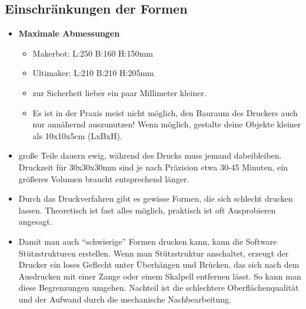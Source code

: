 \documentclass{\basedir/fablab-document}
\begin{document}
\subsection{Einschränkungen der Formen}
\begin{itemize}
\item \textbf{Maximale Abmessungen} 
\begin{itemize}
 \item Makerbot: L:250 B:160 H:150mm
 \item Ultimaker: L:210 B:210 H:205mm
 \item zur Sicherheit lieber ein paar Millimeter kleiner.
 \item Es ist in der Praxis meist nicht möglich, den Bauraum des Druckers auch nur annähernd auszunutzen! Wenn möglich, gestalte deine Objekte kleiner als 10x10x5cm (LxBxH).
\end{itemize}
\item große Teile dauern ewig, während des Drucks muss jemand dabeibleiben. Druckzeit für 30x30x30mm sind je 
nach Präzision etwa 30-45 Minuten, ein größeres Volumen braucht entsprechend länger.
\item Durch das Druckverfahren gibt es gewisse Formen, die sich schlecht drucken lassen. Theoretisch ist fast
alles möglich, praktisch ist oft Ausprobieren angesagt. 
\item Damit man auch \enquote{schwierige} Formen drucken kann, kann die Software Stützstrukturen erstellen. Wenn man Stützstruktur anschaltet,
erzeugt der Drucker ein loses Geflecht unter Überhängen und Brücken,
das sich nach dem Ausdrucken mit einer Zange oder einem Skalpell entfernen lässt. So kann
man diese Begrenzungen umgehen. Nachteil ist die schlechtere
Oberflächenqualität und der Aufwand durch die mechanische
Nachbearbeitung.
\end{itemize}
\end{document}
